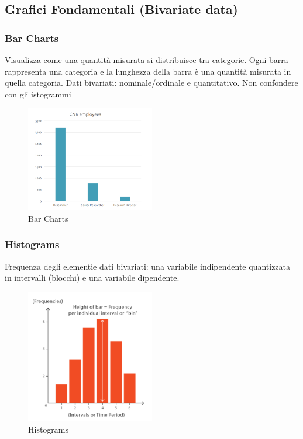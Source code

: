 \subsection{Grafici Fondamentali (Bivariate data)} %


\subsubsection{Bar Charts}
Visualizza come una quantità misurata si distribuisce tra categorie. Ogni barra rappresenta una categoria e la lunghezza della barra è una quantità misurata in quella categoria. Dati bivariati: nominale/ordinale e quantitativo.
 Non confondere con gli istogrammi
\begin{figure}[H]
    \centering
    \includegraphics[width=0.5\textwidth]{images/BarChart.png} 
    \caption{Bar Charts}
    \label{fig:immagine}
\end{figure}
\subsubsection{Histograms}
Frequenza degli elementie dati bivariati: una variabile indipendente quantizzata in intervalli 
(blocchi) e una variabile dipendente.
\begin{figure}[H]
    \centering
    \includegraphics[width=0.5\textwidth]{images/Histograms.png} 
    \caption{Histograms}
    \label{fig:immagine}
\end{figure}
